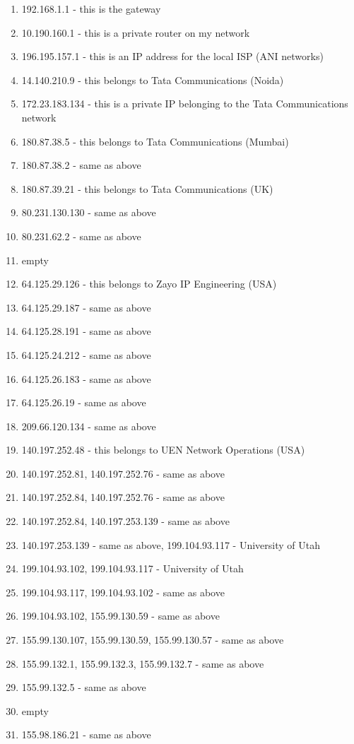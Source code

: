 \documentclass[a4paper]{article}
\begin{document}
\begin{enumerate}
    \item 192.168.1.1 - this is the gateway
    \item 10.190.160.1 - this is a private router on my network
    \item 196.195.157.1 - this is an IP address for the local ISP (ANI networks)
    \item 14.140.210.9 - this belongs to Tata Communications (Noida)
    \item 172.23.183.134 - this is a private IP belonging to the Tata Communications network
    \item 180.87.38.5 - this belongs to Tata Communications (Mumbai)
    \item 180.87.38.2 - same as above
    \item 180.87.39.21 - this belongs to Tata Communications (UK)
    \item 80.231.130.130 - same as above
    \item 80.231.62.2 - same as above
    \item empty
    \item 64.125.29.126 - this belongs to Zayo IP Engineering (USA)
    \item 64.125.29.187 - same as above
    \item 64.125.28.191 - same as above
    \item 64.125.24.212 - same as above
    \item 64.125.26.183 - same as above
    \item 64.125.26.19 - same as above
    \item 209.66.120.134 - same as above
    \item 140.197.252.48 - this belongs to UEN Network Operations (USA)
    \item 140.197.252.81, 140.197.252.76 - same as above
    \item 140.197.252.84, 140.197.252.76 - same as above
    \item 140.197.252.84, 140.197.253.139 - same as above
    \item 140.197.253.139 - same as above, 199.104.93.117 - University of Utah
    \item 199.104.93.102, 199.104.93.117 - University of Utah
    \item 199.104.93.117, 199.104.93.102 - same as above
    \item 199.104.93.102, 155.99.130.59 - same as above
    \item 155.99.130.107, 155.99.130.59, 155.99.130.57 - same as above
    \item 155.99.132.1, 155.99.132.3, 155.99.132.7 - same as above
    \item 155.99.132.5 - same as above
    \item empty
    \item 155.98.186.21 - same as above
\end{enumerate}
\end{document}
